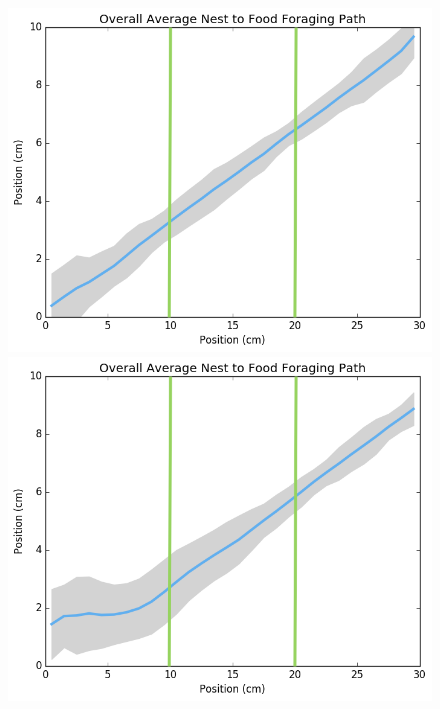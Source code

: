 \begin{figure}[!htb]
\begin{minipage}{0.33\textwidth}
\includegraphics[width=\textwidth]{img/corner-to-corner-average_path_negpidiv3.png}
\end{minipage}%
\begin{minipage}{0.05\textwidth}
\end{minipage}%
\begin{minipage}{0.33\textwidth}
\includegraphics[width=\textwidth]{img/corner-to-corner-average_path_0.png}
\end{minipage}%

\end{figure}
